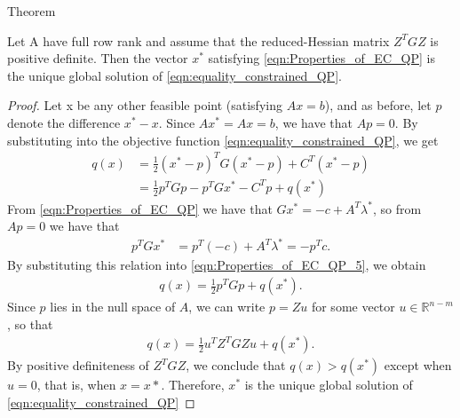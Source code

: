 \begin{mybox}{Theorem}
\begin{theorem}
	Let A have full row rank and assume that the reduced-Hessian matrix $Z^TGZ$ is positive definite. Then the vector $x^*$ satisfying \ref{eqn:Properties_of_EC_QP} is the unique global solution of \ref{eqn:equality_constrained_QP}.
\end{theorem}
\end{mybox}
\begin{proof}
	Let x be any other feasible point (satisfying $Ax=b$), and as before, let $p$ denote the difference $x^*-x$. Since $Ax^*=Ax=b$, we have that $Ap=0$. By substituting into the objective function \ref{eqn:equality_constrained_QP}, we get
	\begin{equation}
	\begin{aligned}
		q(x) & = \frac{1}{2}(x^*-p)^TG(x^*-p)+C^T(x^*-p)\\
		& = \frac{1}{2}p^TGp-p^TGx^*-C^Tp+q(x^*)
	\end{aligned}
	\label{eqn:Properties_of_EC_QP_5}
	\end{equation}
	From \ref{eqn:Properties_of_EC_QP} we have that $Gx^*=-c+A^T\lambda^*$, so from $Ap = 0$ we have that
	\begin{equation}
	\begin{aligned}
		p^TGx^* &= p^T(-c)+A^T\lambda^* = -p^Tc.
	\end{aligned}
	\label{eqn:Properties_of_EC_QP_6}
	\end{equation}
	By substituting this relation into \ref{eqn:Properties_of_EC_QP_5}, we obtain
	\begin{equation}
	\begin{aligned}
		q(x)= \frac{1}{2} p^TGp + q(x^*).
	\end{aligned}
	\label{eqn:Properties_of_EC_QP_7}
	\end{equation}
	Since $p$ lies in the null space of $A$, we can write $p=Zu$ for some vector $u\in \mathbb{R}^{n-m}$, so that
	\begin{equation}
	\begin{aligned}
		q(x)= \frac{1}{2} u^TZ^TGZu + q(x^*).
	\end{aligned}
	\label{eqn:Properties_of_EC_QP_8}
	\end{equation}
	By positive definiteness of $Z^TGZ$, we conclude that $q(x)>q(x^*)$ except when $u=0$, that is, when $x=x*$. Therefore, $x^*$ is the unique global solution of \ref{eqn:equality_constrained_QP}
\end{proof}


